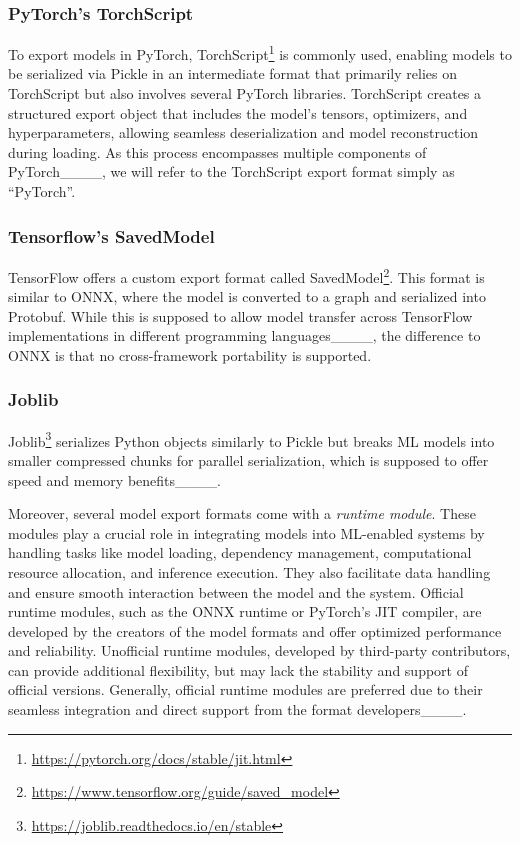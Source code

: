 \subsubsection{PyTorch's TorchScript}
To export models in PyTorch, TorchScript\footnote{\url{https://pytorch.org/docs/stable/jit.html}} is commonly used, enabling models to be serialized via Pickle in an intermediate format that primarily relies on TorchScript but also involves several PyTorch libraries. TorchScript creates a structured export object that includes the model's tensors, optimizers, and hyperparameters, allowing seamless deserialization and model reconstruction during loading. As this process encompasses multiple components of PyTorch____, we will refer to the TorchScript export format simply as \enquote{PyTorch}.

\subsubsection{Tensorflow's SavedModel}
TensorFlow offers a custom export format called SavedModel\footnote{\url{https://www.tensorflow.org/guide/saved_model}}.
This format is similar to ONNX, where the model is converted to a graph and serialized into Protobuf.
While this is supposed to allow model transfer across TensorFlow implementations in different programming languages____, the difference to ONNX is that no cross-framework portability is supported.

\subsubsection{Joblib}
Joblib\footnote{\url{https://joblib.readthedocs.io/en/stable}} serializes Python objects similarly to Pickle but breaks ML models into smaller compressed chunks for parallel serialization, which is supposed to offer speed and memory benefits____.

Moreover, several model export formats come with a \textit{runtime module}.
These modules play a crucial role in integrating models into ML-enabled systems by handling tasks like model loading, dependency management, computational resource allocation, and inference execution.
They also facilitate data handling and ensure smooth interaction between the model and the system.
Official runtime modules, such as the ONNX runtime or PyTorch's JIT compiler, are developed by the creators of the model formats and offer optimized performance and reliability.
Unofficial runtime modules, developed by third-party contributors, can provide additional flexibility, but may lack the stability and support of official versions.
Generally, official runtime modules are preferred due to their seamless integration and direct support from the format developers____.

